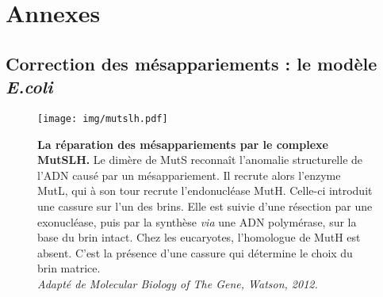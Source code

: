 \newpage
{}


\newpage
{}
\setcounter{page}{1}
\setcounter{lof}{1}

\setcounter{section}{0}
\section{Annexes}
\setcounter{subsection}{1}




\subsection{Correction des mésappariements : le modèle {\em E.coli}}
\begin{figure*}[htbp]
  \centering
  \texttt{[image: img/mutslh.pdf]}
  \caption*{{\bf La réparation des mésappariements par le complexe MutSLH.}
    \rmfamily Le dimère de MutS reconnaît l’anomalie structurelle de l’ADN causé
    par un mésappariement. Il recrute alors l’enzyme MutL, qui à son tour
    recrute l’endonucléase MutH. Celle-ci introduit une cassure sur l’un des
    brins. Elle est suivie d’une résection par une exonucléase, puis par la
    synthèse {\em via} une ADN polymérase, sur la base du brin intact. Chez les
    eucaryotes, l'homologue de MutH est absent. C'est la présence d'une cassure
    qui détermine le choix du brin matrice.\\
    {\em Adapté de Molecular Biology of The Gene, Watson, 2012.}}
  \label{mutslh}
\end{figure*}

